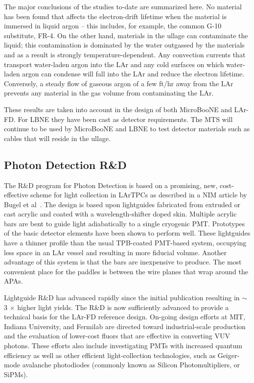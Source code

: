 The major conclusions of the studies to-date are summarized here. No material has been found that affects the electron-drift lifetime when the material is immersed in liquid argon -- this includes, for example, the common G-10 substitute, FR-4. On the other hand, materials in the ullage can contaminate the liquid; this contamination is dominated by the water outgassed by the materials and as a result is strongly temperature-dependent. Any convection currents that transport water-laden argon into the LAr and any cold surfaces on which water-laden argon can condense will fall into the LAr and reduce the electron lifetime. Conversely,  a steady flow of gaseous argon of a few ft/hr away from the LAr prevents any material in the gas volume from contaminating the LAr. 

These results are taken into account in the design of both MicroBooNE and LAr-FD. For LBNE they have been cast as detector requirements. The MTS will continue to be used by MicroBooNE and LBNE to test detector materials such as cables that will reside in the ullage.


\subsection{Photon Detection R\&D}


The R\&D program  for Photon Detection is based on a promising, new, cost-effective scheme for light collection in LArTPCs as described in a NIM article by Bugel et al~\cite{lightGuides}. The design is based upon lightguides fabricated from extruded or cast acrylic and coated with a wavelength-shifter doped skin.  Multiple acrylic bars are bent to guide light adiabatically to a single cryogenic PMT. Prototypes of the basic detector elements have been shown to perform well.  These lightguides have a thinner profile than the usual TPB-coated PMT-based system, occupying less space in an LAr vessel and resulting in more fiducial volume.  Another advantage of this system is that the bars are inexpensive to produce. The most convenient place for the paddles is between the wire planes that wrap around the APAs.

Lightguide R\&D has advanced rapidly since the initial publication resulting in $\sim$3 $\times$ higher light yields. The R\&D is now sufficiently advanced to provide a technical basis for the LAr-FD reference design. On-going design efforts at MIT, Indiana University, and Fermilab are directed toward industrial-scale production and the evaluation of lower-cost fluors that are effective in converting VUV photons. These efforts also include investigating PMTs with increased quantum efficiency as well as other efficient light-collection technologies, such as Geiger-mode avalanche photodiodes (commonly known as Silicon Photomultipliers, or SiPMs).

